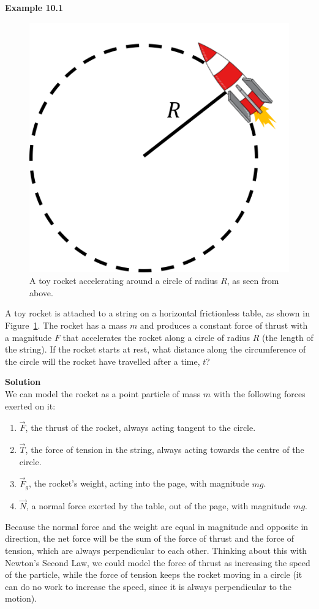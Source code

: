 \begin{framed}
\textbf{Example 10.1}\\
\begin{figure}[!htbp]
\centering
\includegraphics[width=0.375\linewidth]{files/rocket-0b390ecbeda90cfa16a9d338c601a204.png}
\caption[]{A toy rocket accelerating around a circle of radius $R$, as seen from above.}
\label{fig:rotationaldynamics:rocket}
\end{figure}

A toy rocket is attached to a string on a horizontal frictionless table, as shown in Figure~\ref{fig:rotationaldynamics:rocket}. The rocket has a mass $m$ and produces a constant force of thrust with a magnitude $F$ that accelerates the rocket along a circle of radius $R$ (the length of the string). If the rocket starts at rest, what distance along the circumference of the circle will the rocket have travelled after a time, $t$?

\begin{framed}
\textbf{Solution}\\
We can model the rocket as a point particle of mass $m$ with the following forces exerted on it:

\begin{enumerate}
\item $\vec F$, the thrust of the rocket, always acting tangent to the circle.
\item $\vec T$, the force of tension in the string, always acting towards the centre of the circle.
\item $\vec F_g$, the rocket's weight, acting into the page, with magnitude $mg$.
\item $\vec N$, a normal force exerted by the table, out of the page, with magnitude $mg$.
\end{enumerate}

Because the normal force and the weight are equal in magnitude and opposite in direction, the net force will be the sum of the force of thrust and the force of tension, which are always perpendicular to each other. Thinking about this with Newton's Second Law, we could model the force of thrust as increasing the speed of the particle, while the force of tension keeps the rocket moving in a circle (it can do no work to increase the speed, since it is always perpendicular to the motion).


\end{framed}
\end{framed}
